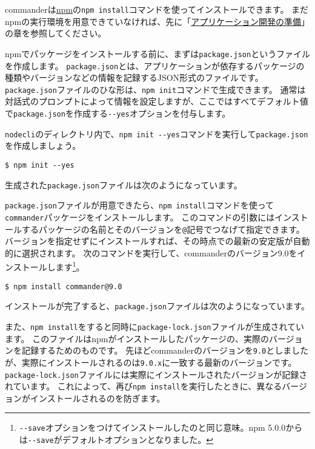 commanderは\href{https://www.npmjs.com/}{npm}の\texttt{npm install}コマンドを使ってインストールできます。
まだnpmの実行環境を用意できていなければ、先に「\hyperlink{setup-local-env}{アプリケーション開発の準備}」の章を参照してください。

npmでパッケージをインストールする前に、まずは\texttt{package.json}というファイルを作成します。
\texttt{package.json}とは、アプリケーションが依存するパッケージの種類やバージョンなどの情報を記録するJSON形式のファイルです。
\texttt{package.json}ファイルのひな形は、\texttt{npm init}コマンドで生成できます。
通常は対話式のプロンプトによって情報を設定しますが、ここではすべてデフォルト値で\texttt{package.json}を作成する\texttt{-\/-yes}オプションを付与します。

\texttt{nodecli}のディレクトリ内で、\texttt{npm init -\/-yes}コマンドを実行して\texttt{package.json}を作成しましょう。

\begin{lstlisting}
$ npm init --yes
\end{lstlisting}

生成された\texttt{package.json}ファイルは次のようになっています。



\texttt{package.json}ファイルが用意できたら、\texttt{npm install}コマンドを使って\texttt{commander}パッケージをインストールします。
このコマンドの引数にはインストールするパッケージの名前とそのバージョンを\texttt{@}記号でつなげて指定できます。
バージョンを指定せずにインストールすれば、その時点での最新の安定版が自動的に選択されます。
次のコマンドを実行して、commanderのバージョン9.0をインストールします\footnote{\texttt{-\/-save}オプションをつけてインストールしたのと同じ意味。npm
  5.0.0からは\texttt{-\/-save}がデフォルトオプションとなりました。}。

\begin{lstlisting}
$ npm install commander@9.0
\end{lstlisting}

インストールが完了すると、\texttt{package.json}ファイルは次のようになっています。



また、\texttt{npm install}をすると同時に\texttt{package-lock.json}ファイルが生成されています。
このファイルはnpmがインストールしたパッケージの、実際のバージョンを記録するためのものです。
先ほどcommanderのバージョンを\texttt{9.0}としましたが、実際にインストールされるのは\texttt{9.0.x}に一致する最新のバージョンです。
\texttt{package-lock.json}ファイルには実際にインストールされたバージョンが記録されています。
これによって、再び\texttt{npm install}を実行したときに、異なるバージョンがインストールされるのを防ぎます。

